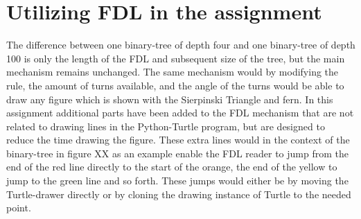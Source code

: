 \documentclass[titlepage]{article}
\begin{document}
\section{Utilizing FDL in the assignment}
The difference between one binary-tree of depth four and one binary-tree of depth 100 is only the length of the FDL and subsequent size of the tree, but the main mechanism remains unchanged.  The same mechanism would by modifying the rule, the amount of turns available, and the angle of the turns would be able to draw any figure which is shown with the Sierpinski Triangle and fern.  In this assignment additional parts have been added to the FDL mechanism that are not related to drawing lines in the Python-Turtle program, but are designed to reduce the time drawing the figure. These extra lines would in the context of the binary-tree in figure XX  as an example enable the FDL reader to jump from the end of the red line directly to the start of the orange, the end of the yellow to jump to the green line and so forth. These jumps would either be by moving the Turtle-drawer directly or by cloning the drawing instance of Turtle to the needed point. 
\end{document}
